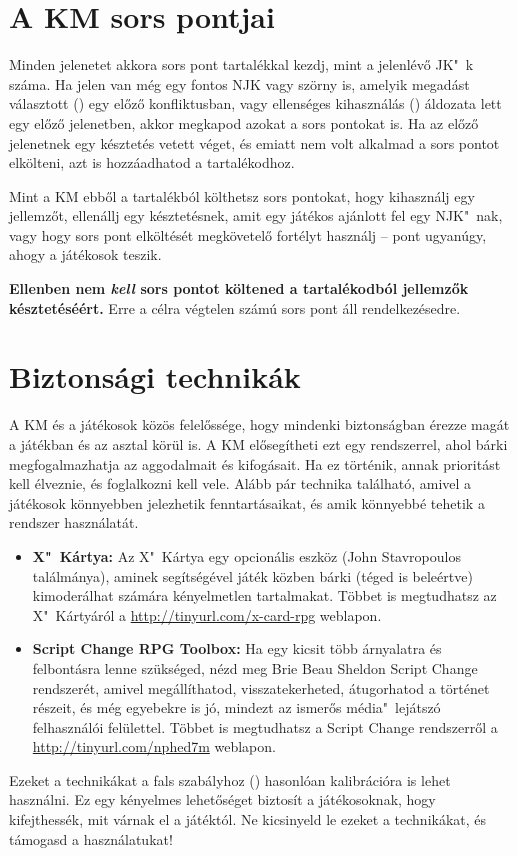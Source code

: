 \label{A KM sors pontjai}
\section{A KM sors pontjai}

Minden jelenetet akkora sors pont tartalékkal kezdj, mint a jelenlévő JK"~k száma. Ha jelen van még egy fontos NJK vagy szörny is, amelyik megadást választott () egy előző konfliktusban, vagy ellenséges kihasználás () áldozata lett egy előző jelenetben, akkor megkapod azokat a sors pontokat is. Ha az előző jelenetnek egy késztetés vetett véget, és emiatt nem volt alkalmad a sors pontot elkölteni, azt is hozzáadhatod a tartalékodhoz.


Mint a KM ebből a tartalékból költhetsz sors pontokat, hogy kihasználj egy jellemzőt, ellenállj egy késztetésnek, amit egy játékos ajánlott fel egy NJK"~nak, vagy hogy sors pont elköltését megkövetelő fortélyt használj -- pont ugyanúgy, ahogy a játékosok teszik.

\textbf{Ellenben nem \emph{kell} sors pontot költened a tartalékodból jellemzők késztetéséért.} Erre a célra végtelen számú sors pont áll rendelkezésedre.

\label{Biztonsági technikák}
\section{Biztonsági technikák}

A KM és a játékosok közös felelőssége, hogy mindenki biztonságban érezze magát a játékban és az asztal körül is. A KM elősegítheti ezt egy rendszerrel, ahol bárki megfogalmazhatja az aggodalmait és kifogásait. Ha ez történik, annak prioritást kell élveznie, és foglalkozni kell vele. Alább pár technika található, amivel a játékosok könnyebben jelezhetik fenntartásaikat, és amik könnyebbé tehetik a rendszer használatát.

\begin{itemize}
    \item \textbf{X"~Kártya:} Az X"~Kártya egy opcionális eszköz (John Stavropoulos találmánya), aminek segítségével játék közben bárki (téged is beleértve) kimoderálhat számára kényelmetlen tartalmakat. Többet is megtudhatsz az X"~Kártyáról a \url{http://tinyurl.com/x-card-rpg} weblapon.
    \item \textbf{Script Change RPG Toolbox:} Ha egy kicsit több árnyalatra és felbontásra lenne szükséged, nézd meg Brie Beau Sheldon Script Change rendszerét, amivel megállíthatod, visszatekerheted, átugorhatod a történet részeit, és még egyebekre is jó, mindezt az ismerős média"~lejátszó felhasználói felülettel. Többet is megtudhatsz a Script Change rendszerről a \url{http://tinyurl.com/nphed7m} weblapon.
\end{itemize}

Ezeket a technikákat a fals szabályhoz () hasonlóan kalibrációra is lehet használni. Ez egy kényelmes lehetőséget biztosít a játékosoknak, hogy kifejthessék, mit várnak el a játéktól. Ne kicsinyeld le ezeket a technikákat, és támogasd a használatukat!
